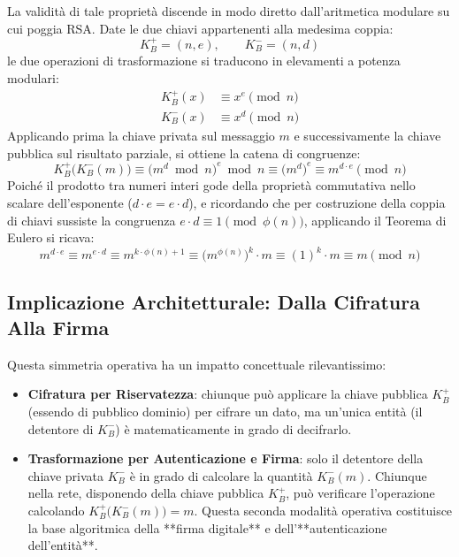 \documentclass[11pt, a4paper]{article}
\begin{document}
La validità di tale proprietà discende in modo diretto dall'aritmetica modulare su cui poggia RSA. Date le due chiavi appartenenti alla medesima coppia:
\[
K_B^+ = (n, e), \qquad K_B^- = (n, d)
\]
le due operazioni di trasformazione si traducono in elevamenti a potenza modulari:
\begin{align*}
    K_B^+(x) &\equiv x^e \pmod n \\
    K_B^-(x) &\equiv x^d \pmod n
\end{align*}
Applicando prima la chiave privata sul messaggio $m$ e successivamente la chiave pubblica sul risultato parziale, si ottiene la catena di congruenze:
\begin{equation}
K_B^+\bigl(K_B^-(m)\bigr) \equiv \bigl(m^d \bmod n\bigr)^e \bmod n \equiv \bigl(m^d\bigr)^e \equiv m^{d \cdot e} \pmod n
\end{equation}
Poiché il prodotto tra numeri interi gode della proprietà commutativa nello scalare dell'esponente ($d \cdot e = e \cdot d$), e ricordando che per costruzione della coppia di chiavi sussiste la congruenza $e \cdot d \equiv 1 \pmod{\phi(n)}$, applicando il Teorema di Eulero si ricava:
\begin{equation}
m^{d \cdot e} \equiv m^{e \cdot d} \equiv m^{k \cdot \phi(n) + 1} \equiv \bigl(m^{\phi(n)}\bigr)^k \cdot m \equiv (1)^k \cdot m \equiv m \pmod n
\end{equation}

\subsection{Implicazione Architetturale: Dalla Cifratura Alla Firma}

Questa simmetria operativa ha un impatto concettuale rilevantissimo:
\begin{itemize}[leftmargin=*]
    \item \textbf{Cifratura per Riservatezza}: chiunque può applicare la chiave pubblica $K_B^+$ (essendo di pubblico dominio) per cifrare un dato, ma un'unica entità (il detentore di $K_B^-$) è matematicamente in grado di decifrarlo.
    \item \textbf{Trasformazione per Autenticazione e Firma}: solo il detentore della chiave privata $K_B^-$ è in grado di calcolare la quantità $K_B^-(m)$. Chiunque nella rete, disponendo della chiave pubblica $K_B^+$, può verificare l'operazione calcolando $K_B^+\bigl(K_B^-(m)\bigr) = m$. Questa seconda modalità operativa costituisce la base algoritmica della **firma digitale** e dell'**autenticazione dell'entità**.
\end{itemize}
\end{document}
